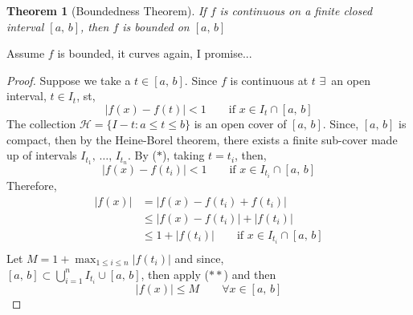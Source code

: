 \documentclass{article}
\newcommand{\sub}{\subset}
\renewcommand{\d}{\delta}
\newcommand{\e}{\varepsilon}
\newcommand{\ex}{\exists\,}
\theoremstyle{mythmstyle}
\newtheorem{theorem}{Theorem}[subsection]
\begin{document}
\begin{theorem}[Boundedness Theorem]
  If $f$ is continuous on a finite closed interval $[a,\, b]$, then $f$ is bounded on $[a,\,b]$
\end{theorem}
  Assume $f$ is bounded, it curves again, I promise...
\begin{proof}
  Suppose we take a $t\in[a,\,b]$. Since $f$ is continuous at $t $  $\ex $ an open interval, $t\in I_t$, st,
  \begin{equation*}
  |f(x) - f(t)|<1 \qquad\text{if $x\in I_t\cap[a,\,b]$}\tag{$*$}
\end{equation*}
  The collection $\displaystyle{\mathcal{H} = \{ I-t : a \le t \le b \}}$ is an open cover of $[a,\, b]$. Since, $[a,\, b]$ is compact, then by the Heine-Borel theorem, there exists a finite sub-cover made up of intervals $I_{t_1},\,\dots,\,I_{t_n}$. By ($*$), taking $t = t_i$, then,
  $$ |f(x) - f(t_i)|< 1 \qquad\text{if $x\in I_{t_i}\cap[a,\,b]$} $$
  Therefore,
  \begin{align*}
    |f(x)| &= |f(x) - f(t_i) + f(t_i)| \\
    &\le |f(x) - f(t_i)| + |f(t_i)| \\
    &\le 1 + |f(t_i)|\qquad \text{if $x\in I_{t_i}\cap[a,\,b]$} \tag{$**$}\\
  \end{align*}
Let $\displaystyle{M = 1 + \max_{1\le i\le n}{|f(t_i)|}}$ and since,\\ $\displaystyle{[a,\,b]\sub \bigcup_{i=1}^n{I_{t_i}\cup[a,\,b]}}$, then apply ($**$) and then
$$ |f(x)| \le M \qquad\forall x\in[a,\,b] $$
\end{proof}
\end{document}
